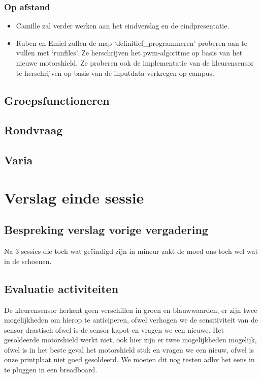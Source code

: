 \documentclass[a4paper,kulak]{kulakarticle} %
\begin{document}
\subsubsection*{Op afstand}
\begin{itemize}
	\item Camille zal verder werken aan het eindverslag en de eindpresentatie.
	\item Ruben en Emiel zullen de map `definitief\_programmeren' proberen aan te vullen met `runfiles'. Ze herschrijven het pwm-algoritme op basis van het nieuwe motorshield. Ze proberen ook de implementatie van de kleurensensor te herschrijven op basis van de inputdata verkregen op campus. 
\end{itemize}

\subsection{Groepsfunctioneren}

\subsection{Rondvraag}

\subsection{Varia}




\section{Verslag einde sessie}

\subsection{Bespreking verslag vorige vergadering}
Na 3 sessies die toch wat geëindigd zijn in mineur zakt de moed ons toch wel wat in de schoenen.

\subsection{Evaluatie activiteiten}
De kleurensensor herkent geen verschillen in groen en blauwwaarden, er zijn twee mogelijkheden om hierop te anticiperen, ofwel verhogen we de sensitiviteit van de sensor drastisch ofwel is de sensor kapot en vragen we een nieuwe. Het gesoldeerde motorshield werkt niet, ook hier zijn er twee mogelijkheden mogelijk, ofwel is in het beste geval het motorshield stuk en vragen we een nieuw, ofwel is onze printplaat niet goed gesoldeerd. We moeten dit nog testen adhv het eens in te pluggen in een breadboard. 
\end{document}
